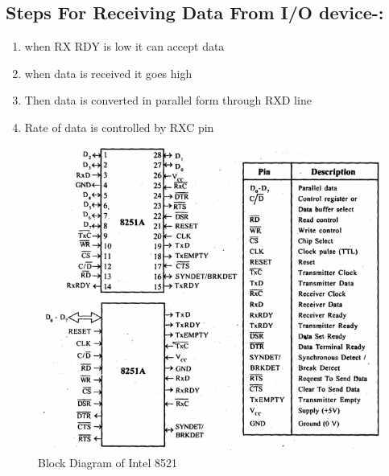 \documentclass[12pt]{report}
\begin{document}
\subsection{Steps For Receiving Data From I/O device-:}
\begin{enumerate}
\item when RX RDY is low it can accept data
\item when data is received it goes high
\item Then data is converted in parallel form through RXD line
\item Rate of data is controlled by RXC pin
\end{enumerate}

\begin{figure}[!h]
	\centering
	\includegraphics[scale=0.5]{5.png}
	  \caption{Block Diagram of Intel 8521 }
\end{figure}
\end{document}
